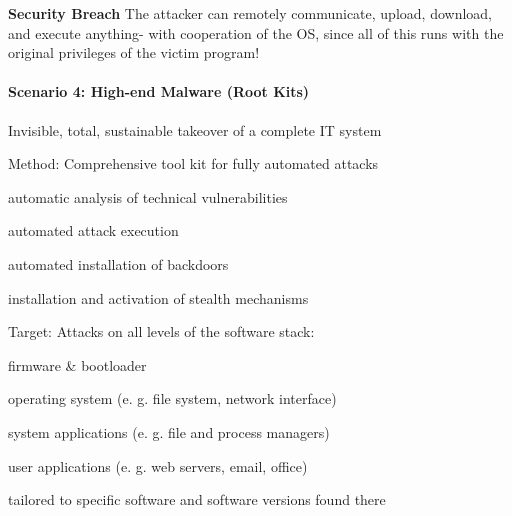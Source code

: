 \documentclass[a4paper]{article}
\renewcommand{\note}[2]{\begin{noteBox} \textbf{#1} #2 \end{noteBox}}
\begin{document}
\begin{multicols}{3}
    \note{Security Breach}{The attacker can remotely communicate, upload, download, and execute anything- with cooperation of the OS, since all of this runs with the original privileges of the victim program!}

    \paragraph{Scenario 4: High-end Malware (Root Kits)}
    \begin{itemize*}
        \item Invisible, total, sustainable takeover of a complete IT system
        \item Method: Comprehensive tool kit for fully automated attacks
        \begin{enumerate*}
            \item automatic analysis of technical vulnerabilities
            \item automated attack execution
            \item automated installation of backdoors
            \item installation and activation of stealth mechanisms
        \end{enumerate*}
        \item Target: Attacks on all levels of the software stack:
        \begin{itemize*}
            \item firmware \& bootloader
            \item operating system (e. g. file system, network interface)
            \item system applications (e. g. file and process managers)
            \item user applications (e. g. web servers, email, office)
        \end{itemize*}
        \item tailored to specific software and software versions found there
    \end{itemize*}


\end{multicols}
\end{document}
